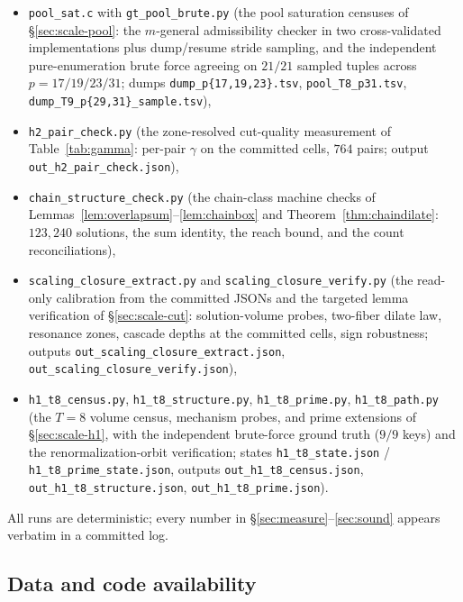 \begin{itemize}[leftmargin=2.2em,itemsep=1pt,topsep=2pt]
        the two frontier cells; output
        \texttt{out\_higher\_rung\_step3.json}),
  \item \texttt{pool\_sat.c} with \texttt{gt\_pool\_brute.py} (the pool
        saturation censuses of \S\ref{sec:scale-pool}: the $m$-general
        admissibility checker in two cross-validated implementations
        plus dump/resume stride sampling, and the independent
        pure-enumeration brute force agreeing on $21/21$ sampled tuples
        across $p=17/19/23/31$; dumps
        \texttt{dump\_p\{17,19,23\}.tsv}, \texttt{pool\_T8\_p31.tsv},
        \texttt{dump\_T9\_p\{29,31\}\_sample.tsv}),
  \item \texttt{h2\_pair\_check.py} (the zone-resolved cut-quality
        measurement of Table~\ref{tab:gamma}: per-pair $\gamma$ on the
        committed cells, $764$ pairs; output
        \texttt{out\_h2\_pair\_check.json}),
  \item \texttt{chain\_structure\_check.py} (the chain-class machine
        checks of Lemmas~\ref{lem:overlapsum}--\ref{lem:chainbox} and
        Theorem~\ref{thm:chaindilate}: $123{,}240$ solutions, the sum
        identity, the reach bound, and the count reconciliations),
  \item \texttt{scaling\_closure\_extract.py} and
        \texttt{scaling\_closure\_verify.py} (the read-only calibration
        from the committed JSONs and the targeted lemma verification of
        \S\ref{sec:scale-cut}: solution-volume probes, two-fiber dilate
        law, resonance zones, cascade depths at the committed cells,
        sign robustness; outputs
        \texttt{out\_scaling\_closure\_extract.json},
        \texttt{out\_scaling\_closure\_verify.json}),
  \item \texttt{h1\_t8\_census.py}, \texttt{h1\_t8\_structure.py},
        \texttt{h1\_t8\_prime.py}, \texttt{h1\_t8\_path.py} (the
        $T=8$ volume census, mechanism probes, and prime extensions of
        \S\ref{sec:scale-h1}, with the independent brute-force ground
        truth ($9/9$ keys) and the renormalization-orbit verification;
        states \texttt{h1\_t8\_state.json} /
        \texttt{h1\_t8\_prime\_state.json}, outputs
        \texttt{out\_h1\_t8\_census.json},
        \texttt{out\_h1\_t8\_structure.json},
        \texttt{out\_h1\_t8\_prime.json}).
\end{itemize}
All runs are deterministic; every number in
\S\ref{sec:measure}--\ref{sec:sound} appears verbatim in a committed log.
\endgroup

\subsection{Data and code availability}

